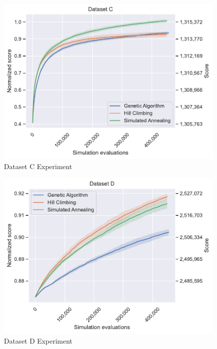 \begin{figure}
    \centering
    \includegraphics[width=\linewidth]{img/experiments/c_Genetic Algorithm_Hill Climbing_Simulated Annealing.pdf}
    \caption[Dataset C Experiment]{
        Dataset C Experiment
    }
    \label{fig:dataset_c_experiment}
\end{figure}

\begin{figure}
    \centering
    \includegraphics[width=\linewidth]{img/experiments/d_Genetic Algorithm_Hill Climbing_Simulated Annealing.pdf}
    \caption[Dataset D Experiment]{
        Dataset D Experiment
    }
    \label{fig:dataset_d_experiment}
\end{figure}

